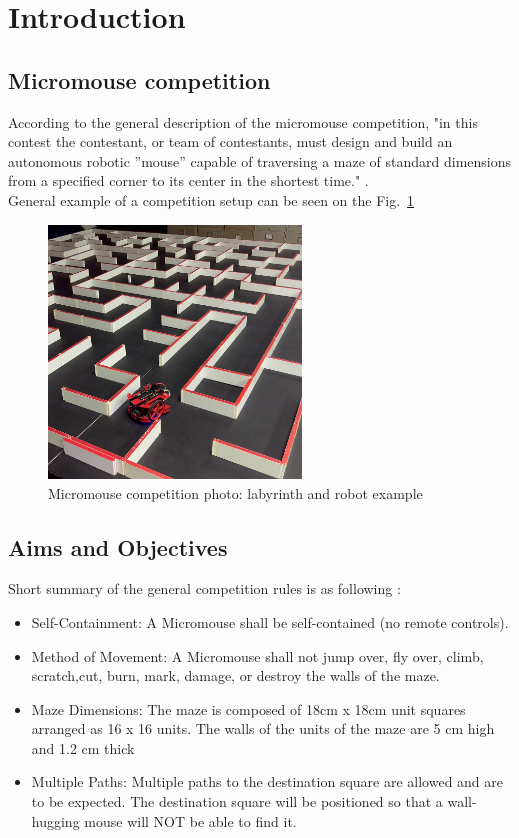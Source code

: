 
\section{Introduction}

\subsection{Micromouse competition}

According to the general description of the micromouse competition, "in this contest the contestant, or team of contestants, must design and build an autonomous robotic ”mouse” capable of traversing a maze of standard dimensions from a specified corner to its center in the shortest time." \cite{MicromouseRules}.\\
General example of a competition setup can be seen on the Fig.~\ref{fig:micromouse} 
\begin{figure}[htb]
    \centering
    \includegraphics[width=0.6\textwidth]{figures/micromouse-maze.jpg}
    \caption{Micromouse competition photo: labyrinth and robot example \cite{MicromousePhotoLink}}
    \label{fig:micromouse}
\end{figure}

\subsection{Aims and Objectives}

    Short summary of the general competition rules is as following \cite{MicromouseRules}:

    \begin{itemize}
    \item Self-Containment: A Micromouse shall be self-contained (no remote controls).
    \item Method of Movement: A Micromouse shall not jump over, fly over, climb, scratch,cut, burn, mark, damage, or destroy the walls of the maze.
    \item Maze Dimensions: The maze is composed of 18cm x 18cm unit squares arranged as 16 x 16 units. The walls of the units of the maze are 5 cm high and 1.2 cm thick 
    \item Multiple Paths: Multiple paths to the destination square are allowed and are to be expected. The destination square will be positioned so that a wall-hugging mouse will NOT be able to find it.
    \end{itemize}
    
